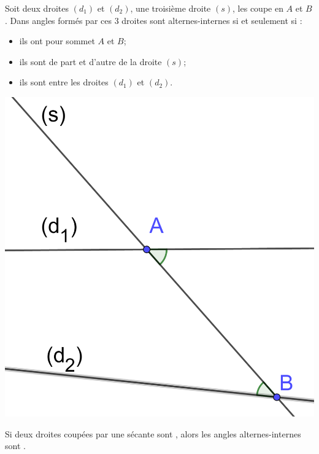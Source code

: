 \documentclass[12pt,a4paper]{article}
\begin{document}
\begin{mydef}
	
	
		Soit deux droites $(d_1)$ et $(d_2)$, une troisième droite $(s)$, les coupe en $A$ et $B$.
		Dans angles formés par ces 3 droites sont alternes-internes si et seulement si :
		
		\begin{multicols}{2}
		\begin{itemize}
			\item ils ont pour sommet $A$ et $B$;
			\item ils sont de part et d'autre de la droite $(s)$;
			\item ils sont entre les droites $(d_1)$ et $(d_2)$.
		\end{itemize}
	
	
		\begin{center}
			\includegraphics[scale=0.13]{alt_int}
		\end{center}
	\end{multicols}

\end{mydef}


\begin{myprop}
	Si deux droites coupées par une sécante sont , alors les angles alternes-internes sont .
\end{myprop}
\end{document}
